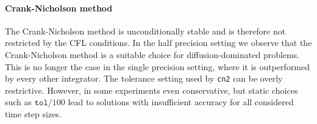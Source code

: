 \documentclass{scrartcl}
\begin{document}
	\paragraph{Crank-Nicholson method}
	The Crank-Nicholson method is unconditionally stable and is therefore not restricted by the CFL conditions. In the half precision setting we observe that the Crank-Nicholson method is a suitable choice for diffusion-dominated problems. This is no longer the case in the single precision setting, where it is outperformed by every other integrator. The tolerance setting used by \texttt{cn2} can be overly restrictive. However, in some experiments even conservative, but static choices such as $\texttt{tol}/100$ lead to solutions with insufficient accuracy for all considered time step sizes.\\
	
\end{document}
